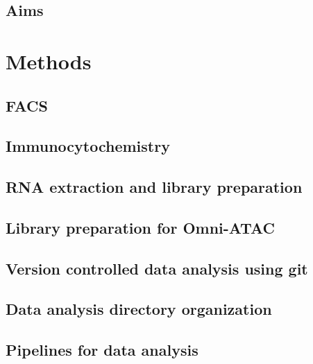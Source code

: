 \documentclass[12pt,twoside]{reedthesis}
\begin{document}
\hypertarget{aims}{%
\section{Aims}\label{aims}}

\hypertarget{methods}{%
\chapter*{Methods}\label{methods}}

\hypertarget{facs}{%
\section{FACS}\label{facs}}

\hypertarget{immunocytochemistry}{%
\section{Immunocytochemistry}\label{immunocytochemistry}}

\hypertarget{rna-extraction-and-library-preparation}{%
\section{RNA extraction and library preparation}\label{rna-extraction-and-library-preparation}}

\hypertarget{library-preparation-for-omni-atac}{%
\section{Library preparation for Omni-ATAC}\label{library-preparation-for-omni-atac}}

\hypertarget{version-controlled-data-analysis-using-git}{%
\section{Version controlled data analysis using git}\label{version-controlled-data-analysis-using-git}}

\hypertarget{data-analysis-directory-organization}{%
\section{Data analysis directory organization}\label{data-analysis-directory-organization}}

\hypertarget{pipelines-for-data-analysis}{%
\section{Pipelines for data analysis}\label{pipelines-for-data-analysis}}
\end{document}
